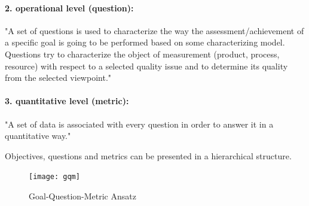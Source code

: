 \paragraph{2. operational level (question):}
"A set of questions is used to characterize the way
the assessment/achievement of a specific goal is going to be performed based on
some characterizing model. Questions try to characterize the object of
measurement (product, process, resource) with respect to a selected quality issue
and to determine its quality from the selected viewpoint." \cite[p. 3]{basili_goalquestionmetric_}

\paragraph{3. quantitative level (metric):}
"A set of data is associated with every question in order to answer it in a quantitative way."
\cite[p. 3]{basili_goalquestionmetric_}

Objectives, questions and metrics can be presented in a hierarchical structure.

\begin{figure}[H] %
    \begin{tcolorbox}[arc=0pt,boxrule=0.5pt]
        \centering
        \texttt{[image: gqm]}
        \caption[GQM tree stucture ]{Goal-Question-Metric Ansatz \cite[p.
        3]{basili_goalquestionmetric_}}
        \label{fig:gqm}
    \end{tcolorbox}
\end{figure}




